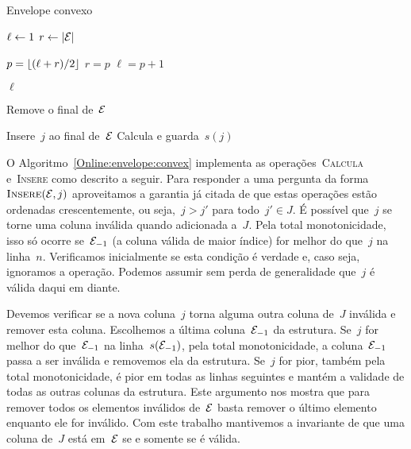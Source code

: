 \begin{algorithm}[h]
\caption{Envelope convexo}
\label{Online:envelope:convex}
\begin{algorithmic}[1]
    \State $\ell \leftarrow 1$
    \State $r \leftarrow |\mathcal{E}|$
    
        \State $p = \lfloor (\ell+r)/2 \rfloor$
            \State $r = p$
        \Else
            \State $\ell = p+1$
        \EndIf
    \EndWhile

    \State \Return $\ell$
\EndFunction

        \State \Return
    \EndIf
    
        \State Remove o final de~$\mathcal{E}$
    \EndWhile

    \State Insere~$j$ ao final de~$\mathcal{E}$
    \State Calcula e guarda~$s(j)$
\EndFunction
\end{algorithmic}
\end{algorithm}

O Algoritmo~\ref{Online:envelope:convex} implementa as operações~\textsc{Calcula} e~\textsc{Insere} como descrito a seguir. Para responder a uma pergunta da forma~$\textsc{Insere}(\mathcal{E},j)$ aproveitamos a garantia já citada de que estas operações estão ordenadas crescentemente, ou seja,~$j > j'$ para todo~$j' \in J$. É possível que~$j$ se torne uma coluna inválida quando adicionada a~$J$. Pela total monotonicidade, isso só ocorre se~$\mathcal{E}_{-1}$ (a coluna válida de maior índice) for melhor do que~$j$ na linha~$n$. Verificamos inicialmente se esta condição é verdade e, caso seja, ignoramos a operação. Podemos assumir sem perda de generalidade que~$j$ é válida daqui em diante.

Devemos verificar se a nova coluna~$j$ torna alguma outra coluna de~$J$ inválida e remover esta coluna. Escolhemos a última coluna~$\mathcal{E}_{-1}$ da estrutura. Se~$j$ for melhor do que~$\mathcal{E}_{-1}$ na linha~$s(\mathcal{E}_{-1})$, pela total monotonicidade, a coluna~$\mathcal{E}_{-1}$ passa a ser inválida e removemos ela da estrutura. Se~$j$ for pior, também pela total monotonicidade, é pior em todas as linhas seguintes e mantém a validade de todas as outras colunas da estrutura. Este argumento nos mostra que para remover todos os elementos inválidos de~$\mathcal{E}$ basta remover o último elemento enquanto ele for inválido. Com este trabalho mantivemos a invariante de que uma coluna de~$J$ está em~$\mathcal{E}$ se e somente se é válida.

